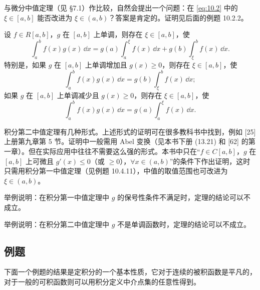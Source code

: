 \begin{xremark}
与微分中值定理（见 §7.1）作比较，自然会提出一个问题：在 \eqref{eq:10.2} 中的 $\xi\in[a,b]$ 能否改进为 $\xi\in(a,b)$？答案是肯定的。证明见后面的例题 10.2.2。
\end{xremark}

\begin{xtheorem}[10.2.2（积分第二中值定理）]
设 $f\in R[a,b]$，$g$ 在 $[a,b]$ 上单调，则存在 $\xi\in[a,b]$，使
\[
  \int_a^b f(x)g(x)\,\dd x
  =g(a)\int_a^\xi f(x)\,\dd x+g(b)\int_\xi^b f(x)\,\dd x.
\]
特别是，如果 $g$ 在 $[a,b]$ 上单调增加且 $g(x)\geqslant0$，则存在 $\xi\in[a,b]$，使
\[
  \int_a^b f(x)g(x)\,\dd x=g(b)\int_\xi^b f(x)\,\dd x;
\]
如果 $g$ 在 $[a,b]$ 上单调减少且 $g(x)\geqslant0$，则存在 $\xi\in[a,b]$，使
\[
  \int_a^b f(x)g(x)\,\dd x=g(a)\int_a^\xi f(x)\,\dd x.
\]
\end{xtheorem}

\begin{xremark}
积分第二中值定理有几种形式。上述形式的证明可在很多教科书中找到，例如 [25] 上册第九章第 5 节。证明中一般需用 Abel 变换（见本书下册 (13.21) 和 [62] 的第一章）。但在实际应用中往往不需要这么强的形式。本书中只在“$f\in C[a,b]$，$g$ 在 $[a,b]$ 上可微且 $g'(x)\leqslant0$（或 $\geqslant0$），$\forall x\in(a,b)$”的条件下作出证明，这时只需用积分第一中值定理（见例题 10.4.11），中值的取值范围也可改进为 $\xi\in(a,b)$。
\end{xremark}

\begin{xthought}[1]
举例说明：在积分第一中值定理中 $g$ 的保号性条件不满足时，定理的结论可以不成立。
\end{xthought}

\begin{xthought}[2]
举例说明：在积分第二中值定理中 $g$ 不是单调函数时，定理的结论可以不成立。
\end{xthought}

\subsection{例题}

下面一个例题的结果是定积分的一个基本性质，它对于连续的被积函数是平凡的，对于一般的可积函数则可以用积分定义中介点集的任意性得到。

